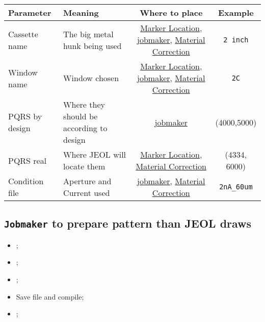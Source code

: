 \begin{table}[htbp]
  \centering
  \begin{tabular}{|p{3cm}|p{3cm}|c|c|}
    \hline
    \textbf{Parameter} & \textbf{Meaning} & \textbf{Where to place} & \textbf{Example}\\\hline\hline
    Cassette name & The big metal hunk being used & \hyperref[sec:marker_location]{Marker Location}, \hyperref[sec:jobmaker]{jobmaker}, \hyperref[sec:material-correction]{Material Correction} & \texttt{2 inch}\\\hline

    Window name & Window chosen  & \hyperref[sec:marker_location]{Marker Location}, \hyperref[sec:jobmaker]{jobmaker}, \hyperref[sec:material-correction]{Material Correction} & \texttt{2C}\\\hline

    PQRS by design & Where they should be according to design & \hyperref[sec:jobmaker]{jobmaker} & (4000,5000) \\\hline
    PQRS real & Where JEOL will locate them & \hyperref[sec:marker_location]{Marker Location}, \hyperref[sec:material-correction]{Material Correction} & (4334, 6000)\\\hline
    Condition file & Aperture and Current used & \hyperref[sec:jobmaker]{jobmaker}, \hyperref[sec:material-correction]{Material Correction} & \verb|2nA_60um|
  \end{tabular}
\end{table}

  
  \subsection{\texttt{Jobmaker} to prepare pattern than JEOL draws}
  \label{sec:jobmaker}
  \begin{itemize}
  \item {};
  \item {};
  \item {};
  \item Save file and compile;
  \item {}\ec;
  \end{itemize}


